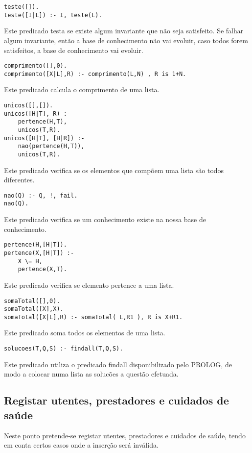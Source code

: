 \documentclass[a4paper]{report} %
\begin{document}
\begin{verbatim}
teste([]).
teste([I|L]) :- I, teste(L).
\end{verbatim}
Este predicado testa se existe algum invariante que não seja satisfeito. Se falhar algum invariante, então a base de conhecimento não vai evoluir, caso todos forem satisfeitos, a base de conhecimento vai evoluir.

\begin{verbatim}
comprimento([],0).
comprimento([X|L],R) :- comprimento(L,N) , R is 1+N.
\end{verbatim}
Este predicado calcula o comprimento de uma lista.

\begin{verbatim}
unicos([],[]).
unicos([H|T], R) :-
    pertence(H,T),
    unicos(T,R).
unicos([H|T], [H|R]) :-
    nao(pertence(H,T)),
    unicos(T,R).
\end{verbatim}
Este predicado verifica se os elementos que compõem uma lista são todos diferentes.

\begin{verbatim}
nao(Q) :- Q, !, fail.
nao(Q).
\end{verbatim}
Este predicado verifica se um conhecimento existe na nossa base de conhecimento.

\begin{verbatim}
pertence(H,[H|T]).
pertence(X,[H|T]) :-
    X \= H,
    pertence(X,T).
\end{verbatim}
Este predicado verifica se elemento pertence a uma lista.

\begin{verbatim}
somaTotal([],0).
somaTotal([X],X).
somaTotal([X|L],R) :- somaTotal( L,R1 ), R is X+R1.
\end{verbatim}
Este predicado soma todos os elementos de uma lista.

\begin{verbatim}
solucoes(T,Q,S) :- findall(T,Q,S).
\end{verbatim}
Este predicado utiliza o predicado findall disponibilizado pelo PROLOG, de modo a colocar numa lista as solucões a
questão efetuada.

\subsection{Registar utentes, prestadores e cuidados de saúde}
Neste ponto pretende-se registar utentes, prestadores e cuidados de saúde, tendo em conta certos casos onde a inserção será inválida.
\par
\end{document}
